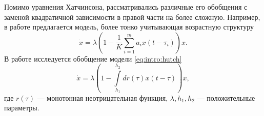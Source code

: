 Помимо уравнения Хатчинсона, рассматривались различные его обобщения с заменой квадратичной зависимости в правой части на более сложную. Например, в работе \cite{Glyzin2007} предлагается модель, более тонко учитывающая возрастную структуру
\begin{equation}
	\label{eq:intro:glyzin2007}
	\dot{x}=\lambda \left(1 - \frac{1}{K}\sum\limits_{i = 1}^{m} a_i x(t-\tau_i)\right) x.
\end{equation}
%
В работе \cite{Kaschenko2012} исследуется обобщение модели \eqref{eq:intro:hutch}
\begin{equation}
	\dot{x} = \lambda \left(1 - \int\limits_{h_1}^{h_2}dr(\tau)x(t - \tau)\right) x,
\end{equation}
где $r(\tau)$ --- монотонная неотрицательная функция, $\lambda, h_1, h_2$ --- положительные параметры.

